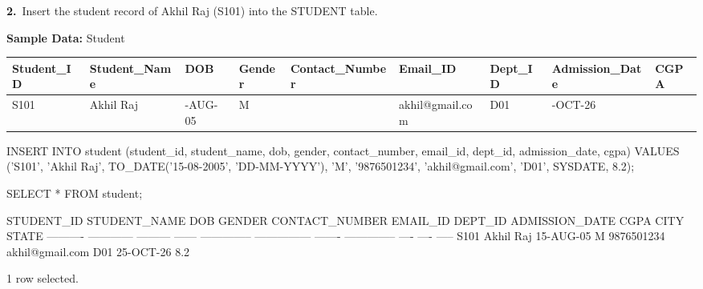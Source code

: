 \noindent\begin{minipage}{\linewidth}
\begingroup{}
{\fontsize{14}{17}\selectfont\textbf{2.}}\ Insert the student record of Akhil Raj (S101) into the STUDENT table.\par
\endgroup\vspace{12pt}

\noindent\textbf{Sample Data:} Student\par
\vspace{6pt}
{\scriptsize\setlength{\tabcolsep}{4pt}
\renewcommand{\arraystretch}{1.25}
\noindent\begin{tabular}{|>{\raggedright\arraybackslash}p{45.0pt}|>{\raggedright\arraybackslash}p{56.1pt}|>{\raggedright\arraybackslash}p{44.1pt}|>{\raggedright\arraybackslash}p{31.2pt}|>{\raggedright\arraybackslash}p{65.0pt}|>{\raggedright\arraybackslash}p{62.8pt}|>{\raggedright\arraybackslash}p{34.8pt}|>{\raggedright\arraybackslash}p{61.5pt}|>{\raggedleft\arraybackslash}p{27.5pt}|}
\hline
\textbf{Student\_ID} & \textbf{Student\_Name} & \textbf{DOB} & \textbf{Gender} & \textbf{Contact\_Number} & \textbf{Email\_ID} & \textbf{Dept\_ID} & \textbf{Admission\_Date} & \textbf{CGPA} \\ \hline
S101 & Akhil Raj & 15-AUG-05 & M & 9876501234 & akhil@gmail.com & D01 & 25-OCT-26 & 8.2 \\ \hline
\end{tabular}\par}
\vspace{14pt}

\begin{sqlcode}
INSERT INTO student (student_id, student_name, dob, gender, contact_number,
                     email_id, dept_id, admission_date, cgpa)
VALUES ('S101', 'Akhil Raj', TO_DATE('15-08-2005', 'DD-MM-YYYY'), 'M',
        '9876501234', 'akhil@gmail.com', 'D01', SYSDATE, 8.2);

SELECT * FROM student;
\end{sqlcode}

\vspace{18pt}


\begin{sqlout}[fontsize=\scriptsize]
STUDENT_ID STUDENT_NAME DOB       GENDER CONTACT_NUMBER EMAIL_ID        DEPT_ID ADMISSION_DATE CGPA CITY STATE
---------- ------------ --------- ------ -------------- --------------- ------- -------------- ---- ---- -----
S101       Akhil Raj    15-AUG-05 M      9876501234     akhil@gmail.com D01     25-OCT-26       8.2

1 row selected.
\end{sqlout}
\end{minipage}\par\vspace{24pt}

